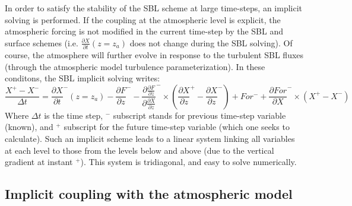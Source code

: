 In order to satisfy the stability of the SBL scheme at large time-steps, an implicit solving is performed. If the coupling at the atmospheric level is explicit, the atmospheric forcing is not modified in the current time-step by the SBL and surface schemes (i.e. $\frac{\partial X}{\partial t}(z=z_a)$ does not change during the SBL solving). Of course, the atmosphere will further evolve in response to the turbulent SBL fluxes (through the atmospheric model turbulence parameterization). In these conditons, the SBL implicit solving writes:
\begin{equation}
\frac{X^+ - X^-}{\Delta t} = \frac{\partial X}{\partial t}^-{(z=z_a)} - \frac{\partial F}{\partial z}^- - \frac{\partial \frac{\partial F}{\partial z}}{\partial \frac{\partial X}{\partial z}}^- \times \left(\frac{\partial X}{\partial z}^+-\frac{\partial X}{\partial z}^-\right) + For^- + \frac{\partial For}{\partial X}^- \times(X^+-X^-)
\label{disc}
\end{equation}
Where $\Delta t$ is the time step, $^-$ subscript stands for previous time-step variable (known), and $^+$ subscript for the future time-step variable (which one seeks to calculate). Such an implicit scheme leads to a linear system linking all variables at each level to those from the levels below and above (due to the vertical gradient at instant $^+$). This system is tridiagonal, and easy to solve numerically. \\


\subsection{Implicit coupling with the atmospheric model}

